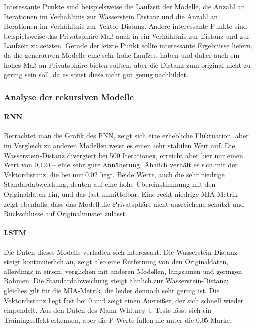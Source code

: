 Interessante Punkte sind beispielsweise die Laufzeit der Modelle, die Anzahl an Iterationen im Verhähltnis zur Wasserstein Distanz und die Anzahl an Iterationen im Verhähltnis zur Vektor Distanz. Andere interessante Punkte sind beispielsweise das Privatsphäre Maß auch in ein Verhähltnis zur Distanz und zur Laufzeit zu setzten.
Gerade der letzte Punkt sollte interessante Ergebnisse liefern, da die generativen Modelle eine sehr hohe Laufzeit haben und daher auch ein hohes Maß an Privatsphäre bieten sollten, aber die Distanz zum original nicht zu gering sein soll, da es sonst diese nicht gut genug nachbildet.

\subsubsection{Analyse der rekursiven Modelle}
\paragraph{\textbf{RNN}}
Betrachtet man die Grafik des RNN, zeigt sich eine erhebliche Fluktuation, aber im Vergleich zu anderen Modellen weist es einen sehr stabilen Wert auf. Die Wasserstein-Distanz divergiert bei 500 Iterationen,
erreicht aber hier nur einen Wert von 0,124 – eine sehr gute Annäherung. Ähnlich verhält es sich mit der Vektordistanz, die bei nur 0,02 liegt. Beide Werte, auch die sehr niedrige Standardabweichung,
deuten auf eine hohe Übereinstimmung mit den Originaldaten hin, und das fast unmittelbar. Eine recht niedrige \ac{MIA}-Metrik zeigt ebenfalls, dass das Modell die Privatsphäre nicht ausreichend schützt und Rückschlüsse auf Originalmuster zulässt.


\paragraph{\textbf{LSTM}}
Die Daten dieses Modells verhalten sich interessant. Die Wasserstein-Distanz steigt kontinuierlich an, zeigt also eine Entfernung von den Originaldaten, allerdings in einem, verglichen mit anderen Modellen,
langsamen und geringen Rahmen. Die Standardabweichung steigt ähnlich zur Wasserstein-Distanz; gleiches gilt für die \ac{MIA}-Metrik, die leider dennoch sehr gering ist. Die Vektordistanz liegt fast bei 0 und zeigt einen Ausreißer,
der sich schnell wieder einpendelt. Aus den Daten des Mann-Whitney-U-Tests lässt sich ein Trainingseffekt erkennen, aber die P-Werte fallen nie unter die 0,05-Marke.



